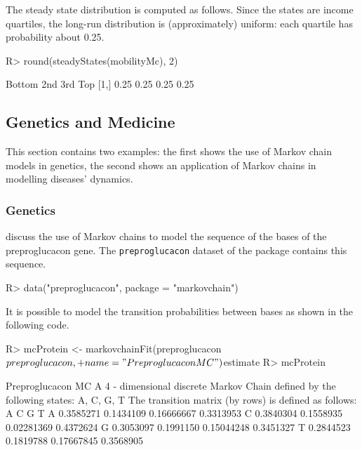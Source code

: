 \documentclass[
  nojss]{jss}
\begin{document}
The steady state distribution is computed as follows. Since the states are income quartiles, the long-run distribution is (approximately) uniform: each quartile has probability about 0.25.

\begin{CodeChunk}
\begin{CodeInput}
R> round(steadyStates(mobilityMc), 2)
\end{CodeInput}
\begin{CodeOutput}
     Bottom  2nd  3rd  Top
[1,]   0.25 0.25 0.25 0.25
\end{CodeOutput}
\end{CodeChunk}

\subsection{Genetics and Medicine}\label{sec:gen}

This section contains two examples: the first shows the use of Markov chain models in genetics, the second shows an application of Markov chains in modelling diseases' dynamics.

\subsubsection{Genetics}\label{sec:genetics}

\cite{averyHenderson} discuss the use of Markov chains to model the sequence of the bases of the preproglucacon gene. The \texttt{preproglucacon} dataset of the  package contains this sequence.

\begin{CodeChunk}
\begin{CodeInput}
R> data("preproglucacon", package = "markovchain")
\end{CodeInput}
\end{CodeChunk}

It is possible to model the transition probabilities between bases as shown in the following code.

\begin{CodeChunk}
\begin{CodeInput}
R> mcProtein <- markovchainFit(preproglucacon$preproglucacon, 
+                           name = "Preproglucacon MC")$estimate
R> mcProtein
\end{CodeInput}
\begin{CodeOutput}
Preproglucacon MC 
 A  4 - dimensional discrete Markov Chain defined by the following states: 
 A, C, G, T 
 The transition matrix  (by rows)  is defined as follows: 
          A         C          G         T
A 0.3585271 0.1434109 0.16666667 0.3313953
C 0.3840304 0.1558935 0.02281369 0.4372624
G 0.3053097 0.1991150 0.15044248 0.3451327
T 0.2844523 0.1819788 0.17667845 0.3568905
\end{CodeOutput}
\end{CodeChunk}
\end{document}
